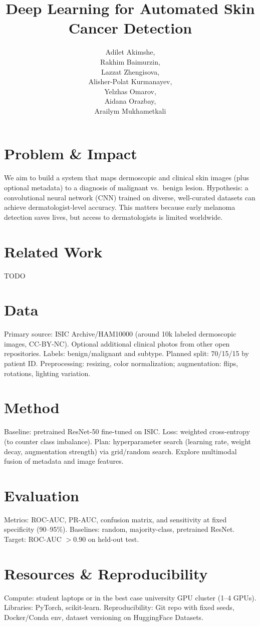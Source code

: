 \documentclass[11pt]{article}
\title{Deep Learning for Automated Skin Cancer Detection}
\author{
	Adilet Akimshe,\\
	Rakhim Baimurzin,\\ 
	Lazzat Zhengisova,\\
	Alisher-Polat Kurmanayev,\\ 
	Yelzhas Omarov,\\
	Aidana Orazbay,\\
	Arailym Mukhametkali}
\date{}
\begin{document}
	\maketitle
	
	\section*{Problem \& Impact}
	We aim to build a system that maps dermoscopic and clinical skin images (plus optional metadata) to a diagnosis of malignant vs.\ benign lesion. Hypothesis: a convolutional neural network (CNN) trained on diverse, well-curated datasets can achieve dermatologist-level accuracy. This matters because early melanoma detection saves lives, but access to dermatologists is limited worldwide.
	
	\section*{Related Work}
	TODO
	
	\section*{Data}
	Primary source: ISIC Archive/HAM10000 (around 10k labeled dermoscopic images, CC-BY-NC). Optional additional clinical photos from other open repositories. Labels: benign/malignant and subtype. Planned split: 70/15/15 by patient ID. Preprocessing: resizing, color normalization; augmentation: flips, rotations, lighting variation.
	
	\section*{Method}
	Baseline: pretrained ResNet-50 fine-tuned on ISIC. Loss: weighted cross-entropy (to counter class imbalance). Plan: hyperparameter search (learning rate, weight decay, augmentation strength) via grid/random search. Explore multimodal fusion of metadata and image features.
	
	\section*{Evaluation}
	Metrics: ROC-AUC, PR-AUC, confusion matrix, and sensitivity at fixed specificity (90–95\%). Baselines: random, majority-class, pretrained ResNet. Target: ROC-AUC $>0.90$ on held-out test.
	
	\section*{Resources \& Reproducibility}
	Compute: student laptops or in the best case university GPU cluster (1–4 GPUs). Libraries: PyTorch, scikit-learn. Reproducibility: Git repo with fixed seeds, Docker/Conda env, dataset versioning on HuggingFace Datasets.
	
\end{document}
